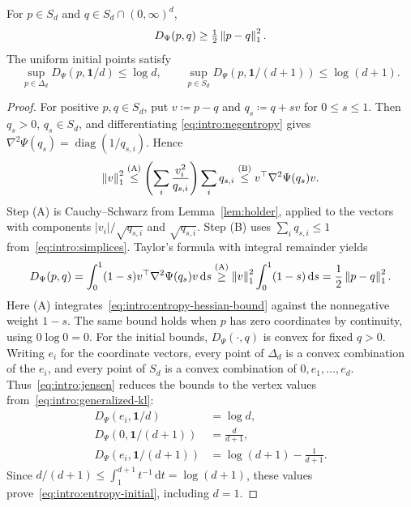 \begin{Thm:Lemma}
\label{lem:intro:entropy}
For $p\in S_d$ and $q\in S_d\cap(0,\infty)^d$,
\begin{equation}\label{eq:intro:entropy-curvature}
 D_\Psi(p,q)\ge\tfrac12\left\lVert p-q \right\rVert_1^2.
\end{equation}
The uniform initial points satisfy
\begin{equation}\label{eq:intro:entropy-initial}
 \sup_{p\in\Delta_d}D_\Psi(p,\mathbf1/d)\le\log d,
 \qquad
 \sup_{p\in S_d}D_\Psi(p,\mathbf1/(d+1))\le\log(d+1).
\end{equation}
\end{Thm:Lemma}
\begin{proof}
For positive $p,q\in S_d$, put $v\coloneqq p-q$ and $q_s\coloneqq q+sv$ for
$0\le s\le1$. Then $q_s>0$, $q_s\in S_d$, and differentiating
\eqref{eq:intro:negentropy} gives
$\nabla^2\Psi(q_s)=\operatorname{diag}(1/q_{s,i})$. Hence
\begin{equation}\label{eq:intro:entropy-hessian-bound}
  \left\lVert v \right\rVert_1^2
 \overset{\mathrm{(A)}}{\le}
 \left(\sum_i\frac{v_i^2}{q_{s,i}}\right)\sum_iq_{s,i}
 \overset{\mathrm{(B)}}{\le} v^\top\nabla^2\Psi(q_s)v.
\end{equation}
Step (A) is Cauchy--Schwarz from Lemma~\ref{lem:holder}, applied to
the vectors with components $|v_i|/\sqrt{q_{s,i}}$ and
$\sqrt{q_{s,i}}$.
Step (B) uses $\sum_iq_{s,i}\le1$ from~\eqref{eq:intro:simplices}.
Taylor's formula with integral remainder yields
\[
 D_\Psi(p,q)
 =\int_0^1(1-s)v^\top\nabla^2\Psi(q_s)v\,\mathrm{d}s
 \overset{\mathrm{(A)}}{\ge}\left\lVert v \right\rVert_1^2\int_0^1(1-s)\,\mathrm{d}s
 =\frac12\left\lVert p-q \right\rVert_1^2.
\]
Here (A) integrates~\eqref{eq:intro:entropy-hessian-bound} against the
nonnegative weight $1-s$.
The same bound holds when $p$ has zero coordinates by continuity, using
$0\log0=0$.
For the initial bounds, $D_\Psi(\cdot,q)$ is convex for fixed $q>0$.
Writing $e_i$ for the coordinate vectors, every point of $\Delta_d$ is a
convex combination of the $e_i$, and every point of $S_d$ is a convex
combination of $0,e_1,\ldots,e_d$. Thus~\eqref{eq:intro:jensen} reduces
the bounds to the vertex values from~\eqref{eq:intro:generalized-kl}:
\[
\begin{aligned}
 D_\Psi(e_i,\mathbf1/d)&=\log d,\\
 D_\Psi(0,\mathbf1/(d+1))&=\frac d{d+1},\\
 D_\Psi(e_i,\mathbf1/(d+1))&=\log(d+1)-\frac1{d+1}.
\end{aligned}
\]
Since $d/(d+1)\le\int_1^{d+1}t^{-1}\,\mathrm{d}t=\log(d+1)$,
these values prove~\eqref{eq:intro:entropy-initial}, including $d=1$.
\end{proof}

